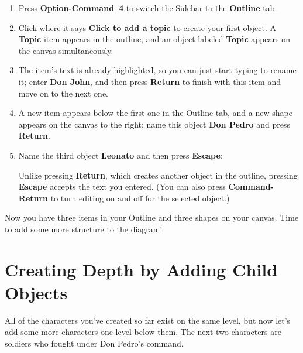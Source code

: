 \documentclass[../main.tex]{subfiles}
\begin{document}
\begin{enumerate}
  \item Press \textbf{Option-Command--4} to switch the Sidebar to the \textbf{Outline} tab.
  \item Click where it says \textbf{Click to add a topic} to create your first object. A
    \textbf{Topic} item appears in the outline, and an object labeled \textbf{Topic} appears on
    the canvas simultaneously.

  \item The item's text is already highlighted, so you can just start typing to rename it; enter
    \textbf{Don John}, and then press \textbf{Return} to finish with this item and move on to
    the next one.

  \item A new item appears below the first one in the Outline tab, and a new shape appears on
    the canvas to the right; name this object \textbf{Don Pedro} and press \textbf{Return}.
  \item Name the third object \textbf{Leonato} and then press \textbf{Escape}:


    Unlike pressing \textbf{Return}, which creates another object in the outline, pressing
    \textbf{Escape} accepts the text you entered. (You can also press \textbf{Command-Return} to
    turn editing on and off for the selected object.)
\end{enumerate}

Now you have three items in your Outline and three shapes on your canvas. Time to add some more
structure to the diagram!

\section{Creating Depth by Adding Child Objects}

All of the characters you've created so far exist on the same level, but now let's add some more
characters one level below them. The next two characters are soldiers who fought under Don
Pedro's command.
\end{document}
